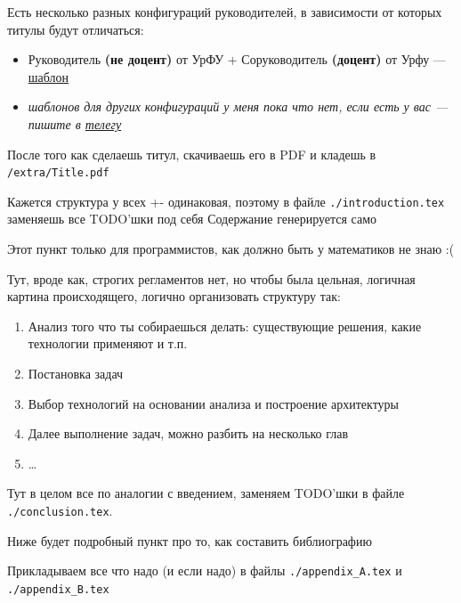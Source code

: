 \label{subsubsec:titul}
Есть несколько разных конфигураций руководителей, в зависимости от которых титулы будут отличаться:
\begin{itemize}
    \item Руководитель \textbf{(не доцент)} от УрФУ + Соруководитель \textbf{(доцент)} от Урфу — \href{https://docs.google.com/document/d/1IOgZB7tnBZlSC6jNtLQielXxP-NEtd9Aqqy75Bwn0ko}{шаблон}
    \item \textit{шаблонов для других конфигураций у меня пока что нет, если есть у вас — пишите в \href{https://t.me/pohotlivi_ded}{телегу}}
\end{itemize}

После того как сделаешь титул, скачиваешь его в PDF и кладешь в \texttt{/extra/Title.pdf}

\label{subsubsec:intro}
Кажется структура у всех +- одинаковая, поэтому в файле \texttt{./introduction.tex} заменяешь все TODO'шки под себя
Содержание генерируется само

\label{subsubsec:chapters}
Этот пункт только для программистов, как должно быть у математиков не знаю :(

Тут, вроде как, строгих регламентов нет, но чтобы была цельная, логичная картина происходящего, логично организовать структуру так:
\begin{enumerate}
    \item Анализ того что ты собираешься делать: существующие решения, какие технологии применяют и т.п.
    \item Постановка задач
    \item Выбор технологий на основании анализа и построение архитектуры
    \item Далее выполнение задач, можно разбить на несколько глав
    \item \ldots
\end{enumerate}

\label{subsubsec:concl}
Тут в целом все по аналогии с введением, заменяем TODO'шки в файле \texttt{./conclusion.tex}.

\label{subsubsec:bibki}
Ниже будет подробный пункт про то, как составить библиографию

\label{subsubsec:appl}
Прикладываем все что надо (и если надо) в файлы \texttt{./appendix\_A.tex} и \texttt{./appendix\_B.tex}

